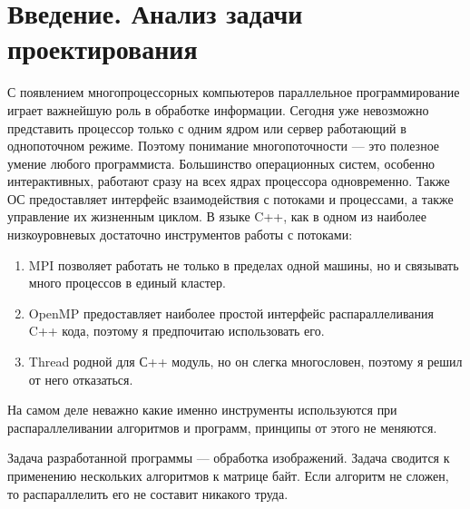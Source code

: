 \section*{Введение. Анализ задачи проектирования}
С появлением многопроцессорных компьютеров параллельное программирование играет важнейшую роль в обработке информации.
Сегодня уже невозможно представить процессор только с одним ядром или сервер работающий в однопоточном режиме.
Поэтому понимание многопоточности --- это полезное умение любого программиста.
Большинство операционных систем, особенно интерактивных, работают сразу на всех ядрах процессора одновременно.
Также ОС предоставляет интерфейс взаимодействия с потоками и процессами, а также управление их жизненным циклом.
В языке C++, как в одном из наиболее низкоуровневых достаточно инструментов работы с потоками:
\begin{enumerate}
    \item MPI позволяет работать не только в пределах одной машины, но и связывать много процессов в единый кластер.
    \item OpenMP предоставляет наиболее простой интерфейс распараллеливания C++ кода, поэтому я предпочитаю использовать его.
    \item Thread родной для С++ модуль, но он слегка многословен, поэтому я решил от него отказаться.{}
\end{enumerate}
На самом деле неважно какие именно инструменты используются при распараллеливании алгоритмов и программ, принципы от этого не меняются.

Задача разработанной программы --- обработка изображений.
Задача сводится к применению нескольких алгоритмов к матрице байт.
Если алгоритм не сложен, то распараллелить его не составит никакого труда.